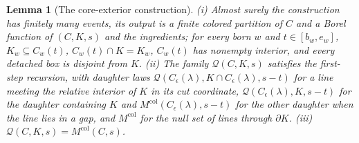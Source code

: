 \documentclass[11pt]{article}
\theoremstyle{plain}
\newtheorem{lemma}[theorem]{Lemma}
\theoremstyle{definition}
\theoremstyle{remark}
\newcommand{\Mcol}{M^{\mathrm{col}}}
\begin{document}
\begin{lemma}[The core-exterior construction]\label{lem:E-coreext}
(i) Almost surely the construction has finitely many events, its output is a
finite colored partition of $C$ and a Borel function of $(C,K,s)$ and the
ingredients; for every born $w$ and $t\in[b_w,e_w]$, $K_w\subseteq C_w(t)$, $C_w(t)\cap K=K_w$,
$C_w(t)$ has nonempty interior, and every detached box is disjoint from $K$.
(ii) The family $\mathcal Q(C,K,s)$ satisfies the first-step recursion, with daughter laws
$\mathcal Q(C_\epsilon(\lambda),K\cap C_\epsilon(\lambda),s-t)$ for a line meeting the relative interior of $K$ in its
cut coordinate, $\mathcal Q(C_\epsilon(\lambda),K,s-t)$ for the daughter containing $K$ and
$\Mcol(C_\epsilon(\lambda),s-t)$ for the other daughter when the line lies in a gap, and
$\Mcol$ for the null set of lines through $\partial K$.
(iii) $\mathcal Q(C,K,s)=\Mcol(C,s)$.
\end{lemma}
\end{document}
